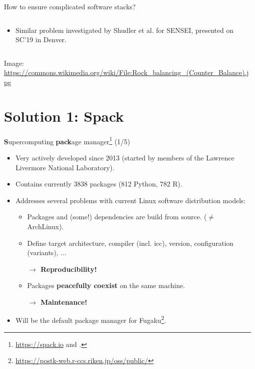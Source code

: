 \documentclass[xcolor=svgnames,xcolor=table,aspectratio=169]{beamer}
\begin{document}
\begin{frame}{How to ensure complicated software stacks?}
\begin{columns}
\begin{column}{.65\textwidth}
\begin{itemize}
\itemsep1em
\item
Similar problem investigated by Shudler et al. \cite{Shudler2019}
for SENSEI, presented on SC'19 in Denver.
\end{itemize}
\end{column}
\end{columns}
\vfill
{\tiny Image:
\url{https://commons.wikimedia.org/wiki/File:Rock_balancing_(Counter_Balance).jpg}
}
\end{frame}



\section{Solution 1: Spack}
\frame{\tableofcontents[currentsection]}



\begin{frame}{\textbf{S}upercomputing \textbf{pack}age
manager\footnote{\url{https://spack.io} and \cite{Gamblin2015}.} (1/5)}

\begin{itemize}
\itemsep1em
\item
Very actively developed since 2013
(started by members of the Lawrence Livermore National Laboratory).

\item
Contains currently 3838 packages (812 Python, 782 R).

\item
Addresses several problems with current Linux software distribution models:
\begin{itemize}
\itemsep1em
\item
Packages and (some!) dependencies are build from source. ($\neq$ ArchLinux).

\item
Define target architecture, compiler (incl. icc), version,
configuration (variants), ...

\textbf{$\rightarrow$ Reproducibility!}

\item
Packages \textbf{peacefully coexist} on the same machine.

\textbf{$\rightarrow$ Maintenance!}
\end{itemize}

\item
Will be the default package manager for
Fugaku\footnote{\url{https://postk-web.r-ccs.riken.jp/oss/public/}}.
\end{itemize}
\end{frame}
\end{document}
